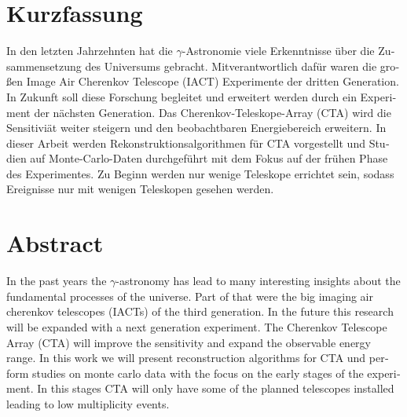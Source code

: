 \thispagestyle{plain}

\section*{Kurzfassung}
\begin{german}
In den letzten Jahrzehnten hat die $\gamma$-Astronomie 
viele Erkenntnisse über die Zusammensetzung des Universums gebracht.
Mitverantwortlich dafür waren die großen Image Air Cherenkov Telescope (IACT)
Experimente der dritten Generation.
In Zukunft soll diese Forschung begleitet und erweitert werden 
durch ein Experiment der nächsten Generation.
Das Cherenkov-Teleskope-Array (CTA) wird die Sensitiviät weiter steigern und den
beobachtbaren Energiebereich erweitern.
In dieser Arbeit werden Rekonstruktionsalgorithmen für CTA vorgestellt und Studien auf 
Monte-Carlo-Daten durchgeführt mit dem Fokus auf der frühen Phase des Experimentes.
Zu Beginn werden nur wenige Teleskope errichtet sein, sodass Ereignisse nur 
mit wenigen Teleskopen gesehen werden.
\end{german}

\section*{Abstract}
\begin{english}
In the past years the $\gamma$-astronomy has lead to many interesting
insights about the fundamental processes of the universe.
Part of that were the big imaging air cherenkov telescopes (IACTs) 
of the third generation.
In the future this research will be expanded with a next generation experiment.
The Cherenkov Telescope Array (CTA) will improve the sensitivity and
expand the observable energy range.
In this work we will present reconstruction algorithms for CTA und perform 
studies on monte carlo data with the focus on the early stages of the experiment.
In this stages CTA will only have some of the planned telescopes installed
leading to low multiplicity events.
\end{english}
